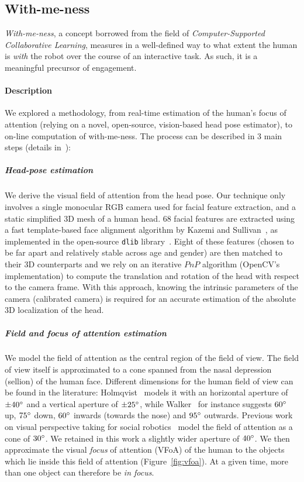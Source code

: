 \documentclass[10pt,a4paper]{article}
\begin{document}
\subsection{With-me-ness}\label{with}
\emph{With-me-ness}, a concept borrowed from the
field of {\it Computer-Supported Collaborative Learning}, measures in a
well-defined way to what extent the human is \emph{with} the robot over the
course of an interactive task. As such, it is a meaningful precursor of
engagement. 
\paragraph{Description}
We explored a methodology, from real-time
estimation of the human's focus of attention (relying on a novel, open-source,
vision-based head pose estimator), to on-line computation of with-me-ness. The process can be described in 3 main steps (details in~\cite{lemaignan2016realtime}):

\subparagraph{Head-pose estimation}
We derive the visual field of attention from the head pose. Our
technique only involves a single monocular RGB camera used for facial feature
extraction, and a static simplified 3D mesh of a human head.  68 facial features
are extracted using a fast template-based face alignment algorithm by Kazemi and
Sullivan~\cite{kazemi2014one}, as implemented in the open-source {\tt dlib}
library~\cite{dlib09}.  Eight of these features (chosen to be far apart and
relatively stable across age and gender) are then matched to their 3D
counterparts and we rely on an iterative $PnP$
algorithm (OpenCV's implementation) to compute the translation and rotation of
the head with respect to the camera frame. With this approach, knowing the
intrinsic parameters of the camera (calibrated camera) is required for an
accurate estimation of the absolute 3D localization of the head.

\subparagraph{Field and focus of attention estimation}
We model the field of attention as the central region of the field of view.  The
field of view itself is approximated to a cone spanned from the nasal depression
(sellion) of the human face. Different dimensions for the human field of view
can be found in the literature: Holmqvist~\cite{holmqvist2011eye} models it
with an horizontal aperture of $ \pm 40\degree $ and a vertical aperture of $
\pm 25\degree $, while Walker~\cite{walker1980clinical} for instance suggests
$60\degree$ up, $75\degree$ down, $60\degree$ inwards (towards the nose) and
$95\degree$ outwards.  Previous work on visual perspective taking for social
robotics~\cite{sisbot2011situation} model the field of attention as a cone of
$30\degree$. We retained in this work a slightly wider aperture of $40\degree$.
We then approximate the visual \emph{focus} of attention (VFoA) of the human to
the objects which lie inside this field of attention (Figure~\ref{fig:vfoa}). At
a given time, more than one object can therefore be \emph{in focus}.
\end{document}
